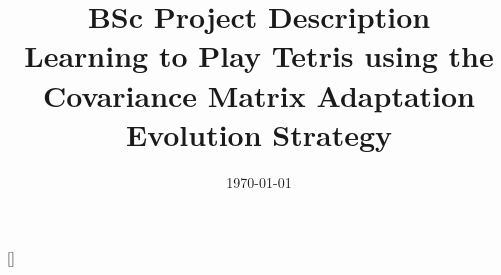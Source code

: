 \documentclass[11pt,a4paper]{article}
\begin{document}
\title{BSc Project Description\\\textbf{Learning to Play Tetris using
    the Covariance Matrix Adaptation
    Evolution Strategy}}
\date{\today}
\maketitle

%















[]

\end{document}
